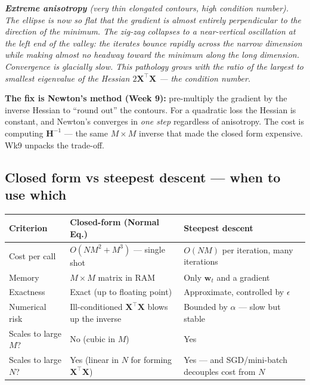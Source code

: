 \documentclass[11pt, a4paper]{article}
\newcommand{\thead}[1]{\textbf{#1}}
\begin{document}
\begin{center}

\footnotesize\textit{\textbf{Extreme anisotropy} (very thin elongated contours, high condition number). The ellipse is now so flat that the gradient is almost entirely perpendicular to the direction of the minimum. The zig-zag collapses to a near-vertical oscillation at the left end of the valley: the iterates bounce rapidly across the narrow dimension while making almost no headway toward the minimum along the long dimension. Convergence is glacially slow. This pathology grows with the ratio of the largest to smallest eigenvalue of the Hessian $2\mathbf{X}^\top\mathbf{X}$ --- the \emph{condition number}.}
\end{center}

\textbf{The fix is Newton's method (Week 9):} pre-multiply the gradient by the inverse Hessian to ``round out'' the contours. For a quadratic loss the Hessian is constant, and Newton's converges in \emph{one step} regardless of anisotropy. The cost is computing $\mathbf{H}^{-1}$ — the same $M\times M$ inverse that made the closed form expensive. Wk9 unpacks the trade-off.

\subsection{Closed form vs steepest descent — when to use which}

\begin{tabularx}{\linewidth}{@{}lXX@{}}
\toprule
\thead{Criterion} & \thead{Closed-form (Normal Eq.)} & \thead{Steepest descent} \\
\midrule
Cost per call    & $O(NM^2 + M^3)$ — single shot & $O(NM)$ per iteration, many iterations \\
Memory           & $M\times M$ matrix in RAM    & Only $\mathbf{w}_t$ and a gradient \\
Exactness        & Exact (up to floating point)  & Approximate, controlled by $\epsilon$ \\
Numerical risk   & Ill-conditioned $\mathbf{X}^\top\mathbf{X}$ blows up the inverse & Bounded by $\alpha$ — slow but stable \\
Scales to large $M$? & No (cubic in $M$)         & Yes \\
Scales to large $N$?  & Yes (linear in $N$ for forming $\mathbf{X}^\top\mathbf{X}$) & Yes — and SGD/mini-batch decouples cost from $N$ \\
\bottomrule
\end{tabularx}
\end{document}
